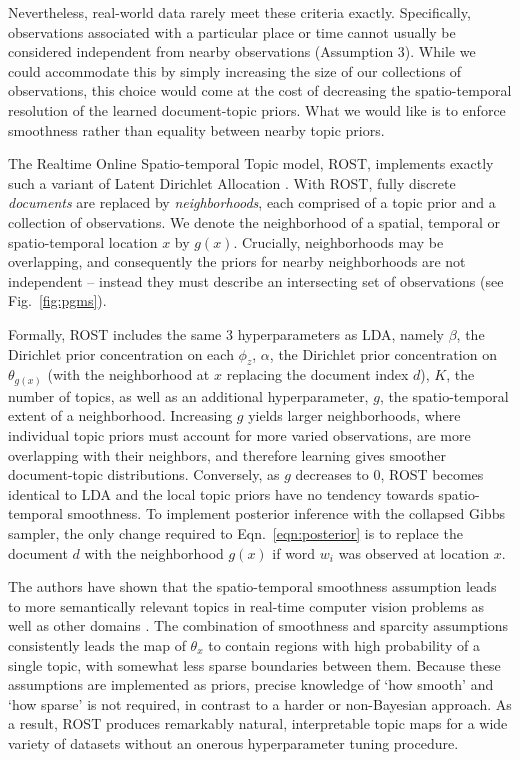 Nevertheless, real-world data rarely meet these criteria exactly. Specifically, observations associated with a particular place or time cannot usually be considered independent from nearby observations (Assumption 3). While we could accommodate this by simply increasing the size of our collections of observations, this choice would come at the cost of decreasing the spatio-temporal resolution of the learned document-topic priors. What we would like is to enforce smoothness rather than equality between nearby topic priors.

The Realtime Online Spatio-temporal Topic model, ROST, implements exactly such a variant of Latent Dirichlet Allocation \citep{Girdhar2014}. With ROST, fully discrete \emph{documents} are replaced by \emph{neighborhoods}, each comprised of a topic prior and a collection of observations. We denote the neighborhood of a spatial, temporal or spatio-temporal location $x$ by $g(x)$. Crucially, neighborhoods may be overlapping, and consequently the priors for nearby neighborhoods are not independent -- instead they must describe an intersecting set of observations (see Fig.~\ref{fig:pgms}).

Formally, ROST includes the same 3 hyperparameters as LDA, namely $\beta$, the Dirichlet prior concentration on each $\phi_z$, $\alpha$, the Dirichlet prior concentration on $\theta_{g(x)}$ (with the neighborhood at $x$ replacing the document index $d$), $K$, the number of topics, as well as an additional hyperparameter, $g$, the spatio-temporal extent of a neighborhood. Increasing $g$ yields larger neighborhoods, where individual topic priors must account for more varied observations, are more overlapping with their neighbors, and therefore learning gives smoother document-topic distributions. Conversely, as $g$ decreases to 0, ROST becomes identical to LDA and the local topic priors have no tendency towards spatio-temporal smoothness. To implement posterior inference with the collapsed Gibbs sampler, the only change required to Eqn.~\ref{eqn:posterior} is to replace the document $d$ with the neighborhood $g(x)$ if word $w_i$ was observed at location $x$.

The authors have shown that the spatio-temporal smoothness assumption leads to more semantically relevant topics in real-time computer vision problems as well as other domains \citep{Girdhar2012, Girdhar2014a, Girdhar2016}. The combination of smoothness and sparcity assumptions consistently leads the map of $\theta_x$ to contain regions with high probability of a single topic, with somewhat less sparse boundaries between them. Because these assumptions are implemented as priors, precise knowledge of `how smooth' and `how sparse' is not required, in contrast to a harder or non-Bayesian approach. As a result, ROST produces remarkably natural, interpretable topic maps for a wide variety of datasets without an onerous hyperparameter tuning procedure.

